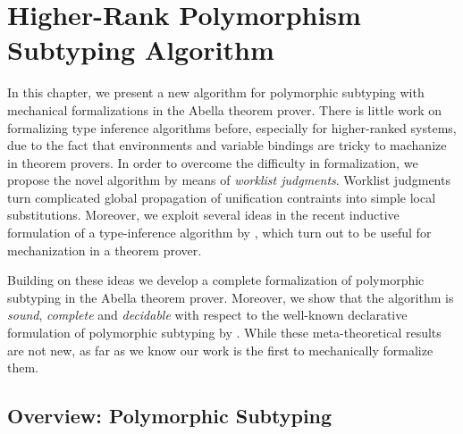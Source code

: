 \chapter{Higher-Rank Polymorphism Subtyping Algorithm}
\label{chap:ITP}

In this chapter, we present a new algorithm for polymorphic subtyping
with mechanical formalizations in the Abella theorem prover.
There is little work on formalizing type inference algorithms before,
especially for higher-ranked systems,
due to the fact that environments and variable bindings are
tricky to machanize in theorem provers.
In order to overcome the difficulty in formalization,
we propose the novel algorithm by means of \emph{worklist judgments}.
Worklist judgments turn complicated
global propagation of unification contraints into simple local substitutions.
Moreover, we exploit several ideas in the recent inductive
formulation of a type-inference algorithm by
\citet{dunfield2013complete}, which turn out to be useful
for mechanization in a theorem prover.

Building on these ideas we develop a complete formalization of
polymorphic subtyping in the Abella theorem prover. Moreover, we
 show that the algorithm is \emph{sound}, \emph{complete} and \emph{decidable} with
respect to the well-known declarative formulation of polymorphic subtyping by
\citet{odersky1996putting}.
While these meta-theoretical results are not new, as far
as we know our work is the first to mechanically formalize them.


\section{Overview: Polymorphic Subtyping}










